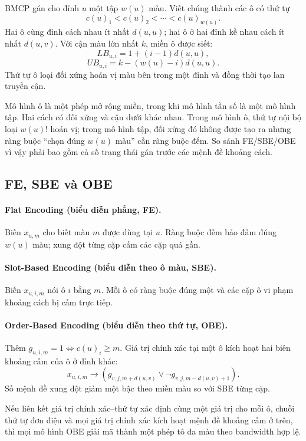 BMCP gán cho đỉnh \(u\) một tập \(w(u)\) màu. Viết chúng thành các ô có thứ
tự
\[
  c(u)_1<c(u)_2<\cdots<c(u)_{w(u)}.
\]
Hai ô cùng đỉnh cách nhau ít nhất \(d(u,u)\); hai ô ở hai đỉnh kề nhau cách ít
nhất \(d(u,v)\). Với cận màu lớn nhất \(k\), miền ô được siết:
\[
  LB_{u,i}=1+(i-1)d(u,u),
\]
\[
  UB_{u,i}=k-(w(u)-i)d(u,u).
\]
Thứ tự ô loại đối xứng hoán vị màu bên trong một đỉnh và đồng thời tạo lan
truyền cận.

Mô hình ô là một phép mở rộng miền, trong khi mô hình tần số là một mô hình
tập. Hai cách có đối xứng và cận dưới khác nhau. Trong mô hình ô, thứ tự nội bộ
loại \(w(u)!\) hoán vị; trong mô hình tập, đối xứng đó không được tạo ra nhưng
ràng buộc ``chọn đúng \(w(u)\) màu'' cần ràng buộc đếm. So sánh FE/SBE/OBE vì
vậy phải bao gồm cả số trạng thái gán trước các mệnh đề khoảng cách.

\subsection{FE, SBE và OBE}

\paragraph{Flat Encoding (biểu diễn phẳng, FE).}
Biến \(x_{u,m}\) cho biết màu \(m\) được dùng tại \(u\). Ràng buộc đếm bảo đảm
đúng \(w(u)\) màu; xung đột từng cặp cấm các cặp quá gần.

\paragraph{Slot-Based Encoding (biểu diễn theo ô màu, SBE).}
Biến \(x_{u,i,m}\) nói ô \(i\) bằng \(m\). Mỗi ô có ràng buộc đúng một và các
cặp ô vi phạm khoảng cách bị cấm trực tiếp.

\paragraph{Order-Based Encoding (biểu diễn theo thứ tự, OBE).}
Thêm \(g_{u,i,m}=1\iff c(u)_i\ge m\). Giá trị chính xác tại một ô kích hoạt
hai biên khoảng cấm của ô ở đỉnh khác:
\[
  x_{u,i,m}\rightarrow
  \left(
    g_{v,j,m+d(u,v)}
    \lor
    \neg g_{v,j,m-d(u,v)+1}
  \right).
\]
Số mệnh đề xung đột giảm một bậc theo miền màu so với SBE từng cặp.

\begin{proposition}
Nếu liên kết giá trị chính xác--thứ tự xác định cùng một giá trị cho mỗi ô,
chuỗi thứ tự đơn điệu và mọi giá trị chính xác kích hoạt mệnh đề khoảng cấm ở
trên, thì mọi mô hình
OBE giải mã thành một phép tô đa màu theo bandwidth hợp lệ.
\end{proposition}

